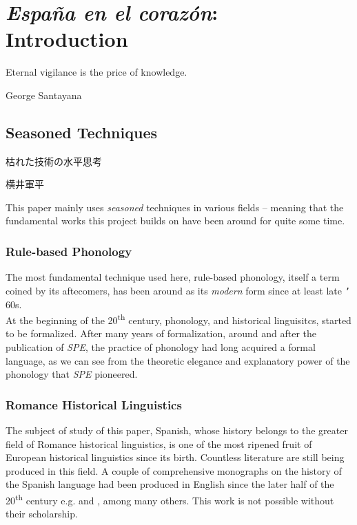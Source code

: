 \documentclass{report}[12pt]
\begin{document}
\pagebreak

\chapter{\emph{España en el corazón}: \\ Introduction}

\epigraph{Eternal vigilance is the price of knowledge.}{George Santayana}

\section{Seasoned Techniques}

\epigraph{枯れた技術の水平思考\footnotemark}{横井軍平}

This paper mainly uses \emph{seasoned} techniques in various fields -- meaning that the fundamental works this project builds on have been around for quite some time. 

\subsection{Rule-based Phonology}

The most fundamental technique used here, rule-based phonology, itself a term coined by its aftecomers, has been around as its \emph{modern} form since at least late \texttt{'}\kern-1pt 60s. \\
At the beginning of the 20\textsuperscript{th} century, phonology, and historical linguisitcs, started to be formalized. After many years of formalization, around and after the publication of \emph{SPE}, the practice of phonology had long acquired a formal language, as we can see from the theoretic elegance and explanatory power of the phonology that \emph{SPE} pioneered.

\subsection{Romance Historical Linguistics}

The subject of study of this paper, Spanish, whose history belongs to the greater field of Romance historical linguistics, is one of the most ripened fruit of European historical linguistics since its birth. Countless literature are still being produced in this field. A couple of comprehensive monographs on the history of the Spanish language had been produced in English since the later half of the 20\textsuperscript{th} century e.g. \cite{penny_spanish} and \cite{lloyd_spanish}, among many others. This work is not possible without their scholarship.
\end{document}
